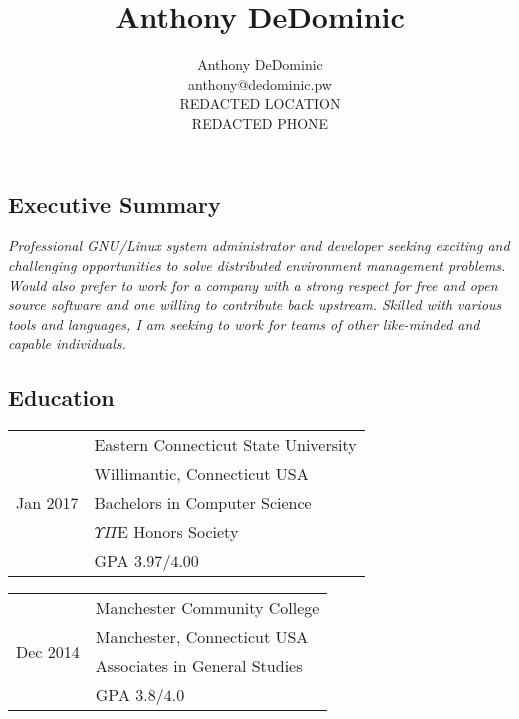 \documentclass[letterpaper,]{article}
\author{Anthony DeDominic\\anthony@dedominic.pw\\REDACTED LOCATION\\REDACTED PHONE}
\title{Anthony DeDominic}
\begin{document}

\subsection{Executive Summary}\label{about}

\emph{Professional GNU/Linux system administrator and developer seeking
exciting and challenging opportunities to solve distributed environment
management problems. Would also prefer to work for a company with
a strong respect for free and open source software and one willing to
contribute back upstream. Skilled with various tools and languages, 
I am seeking to work for teams of other like-minded and capable individuals.}

\subsection{Education}\label{education}

\begin{table}[!ht]
    \begin{minipage}{0.5\linewidth}
    \centering
    \begin{tabular}{r|l}
        \multirow{5}{*}{Jan 2017}
        & Eastern Connecticut State University \\
        & Willimantic, Connecticut USA \\
        & Bachelors in Computer Science \\
        & $\Upsilon \Pi \mathrm{E}$ Honors Society \\
        & GPA $3.97/4.00$ \\
    \end{tabular}
    \end{minipage}
    \begin{minipage}{0.5\linewidth}
    \centering
    \begin{tabular}{r|l}
        \multirow{4}{*}{Dec 2014} 
        & Manchester Community College \\
        & Manchester, Connecticut USA \\
        & Associates in General Studies \\
        & GPA $3.8/4.0$ \\
    \end{tabular}
    \end{minipage}
\end{table}
\end{document}
